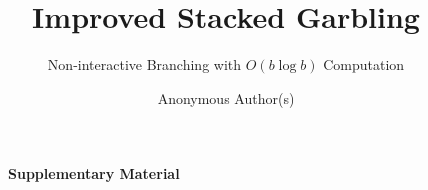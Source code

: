 \documentclass[]{llncs}
\title{%
  Improved Stacked Garbling
}
\subtitle{Non-interactive Branching with $O(b \log b)$ Computation}
\author{Anonymous Author(s)}
\institute{Anonymous Institution}
\author{}
\institute{}
\begin{document}
\maketitle







 
 








\newpage

{\LARGE \bf \verb+    + Supplementary Material}

\begin{appendix}

\end{appendix}
\end{document}
